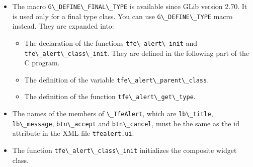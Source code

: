\begin{itemize}
\tightlist
\item
  The macro \passthrough{\lstinline!G\_DEFINE\_FINAL\_TYPE!} is
  available since GLib version 2.70. It is used only for a final type
  class. You can use \passthrough{\lstinline!G\_DEFINE\_TYPE!} macro
  instead. They are expanded into:

  \begin{itemize}
  \tightlist
  \item
    The declaration of the functions
    \passthrough{\lstinline!tfe\_alert\_init!} and
    \passthrough{\lstinline!tfe\_alert\_class\_init!}. They are defined
    in the following part of the C program.
  \item
    The definition of the variable
    \passthrough{\lstinline!tfe\_alert\_parent\_class!}.
  \item
    The definition of the function
    \passthrough{\lstinline!tfe\_alert\_get\_type!}.
  \end{itemize}
\item
  The names of the members of \passthrough{\lstinline!\_TfeAlert!},
  which are \passthrough{\lstinline!lb\_title!},
  \passthrough{\lstinline!lb\_message!},
  \passthrough{\lstinline!btn\_accept!} and
  \passthrough{\lstinline!btn\_cancel!}, must be the same as the id
  attribute in the XML file \passthrough{\lstinline!tfealert.ui!}.
\item
  The function \passthrough{\lstinline!tfe\_alert\_class\_init!}
  initializes the composite widget class.


\end{itemize}
